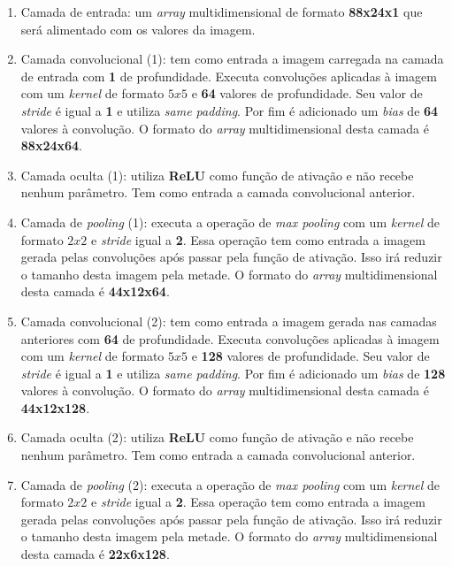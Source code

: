 \begin{enumerate}

\item Camada de entrada: um \textit{array} multidimensional de formato
  {\bf 88x24x1} que será alimentado com os valores da imagem.

\item Camada convolucional (1): tem como entrada a imagem carregada na
  camada de entrada com {\bf 1} de profundidade. Executa convoluções
  aplicadas à imagem com um \textit{kernel} de formato $5x5$ e {\bf
    64} valores de profundidade. Seu valor de \textit{stride} é igual
  a {\bf 1} e utiliza \textit{same padding}. Por fim é adicionado um
  \textit{bias} de {\bf 64} valores à convolução. O formato do \textit{array}
  multidimensional desta camada é {\bf 88x24x64}.

\item Camada oculta (1): utiliza {\bf ReLU} como função de ativação e
  não recebe nenhum parâmetro. Tem como entrada a camada convolucional
  anterior.

\item Camada de \textit{pooling} (1): executa a operação de
  \textit{max pooling} com um \textit{kernel} de formato $2x2$ e
  \textit{stride} igual a {\bf 2}. Essa operação tem como entrada a
  imagem gerada pelas convoluções após passar pela função de
  ativação. Isso irá reduzir o tamanho desta imagem pela metade. O
  formato do \textit{array} multidimensional desta camada é {\bf 44x12x64}.

\item Camada convolucional (2): tem como entrada a imagem gerada
  nas camadas anteriores com {\bf 64} de profundidade. Executa
  convoluções aplicadas à imagem com um \textit{kernel} de formato
  $5x5$ e {\bf 128} valores de profundidade. Seu valor de
  \textit{stride} é igual a {\bf 1} e utiliza \textit{same
    padding}. Por fim é adicionado um \textit{bias} de {\bf 128}
  valores à convolução. O formato do \textit{array} multidimensional desta
  camada é {\bf 44x12x128}.

\item Camada oculta (2): utiliza {\bf ReLU} como função de ativação e
  não recebe nenhum parâmetro. Tem como entrada a camada convolucional
  anterior.

\item Camada de \textit{pooling} (2): executa a operação de
  \textit{max pooling} com um \textit{kernel} de formato $2x2$ e
  \textit{stride} igual a {\bf 2}. Essa operação tem como entrada a
  imagem gerada pelas convoluções após passar pela função de
  ativação. Isso irá reduzir o tamanho desta imagem pela metade. O
  formato do \textit{array} multidimensional desta camada é {\bf 22x6x128}.


\end{enumerate}
